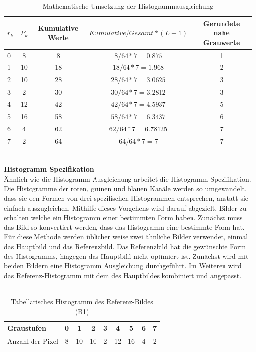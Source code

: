 \documentclass[a4paper,12pt,oneside]{article}
\begin{document}
\begin{table}
[h]
\caption{Mathematische Umsetzung der Histogrammausgleichung}
\centering
\begin{tabular}{|l|c|c|c|c|}
\hline
$r_{k}$ & $P_{k}$ & Kumulative Werte & $Kumulative/Gesamt*(L-1)$ & Gerundete nahe Grauwerte\\
\hline
0 & 8 & 8 & $8/64*7=0.875$ & 1\\
\hline
1 & 10 & 18 & $18/64*7=1.968$ & 2\\
\hline
2 & 10 & 28 & $28/64*7=3.0625$ & 3\\
\hline
3 & 2 & 30 & $30/64*7=3.2812$ & 3\\
\hline
4 & 12 & 42 & $42/64*7=4.5937$ & 5\\
\hline
5 & 16 & 58 & $58/64*7=6.3437$ & 6\\
\hline
6 & 4 & 62 & $62/64*7=6.78125$ & 7\\
\hline
7 & 2 & 64 & $64/64*7=7$ & 7\\
\hline
\end{tabular}
\end{table}\\
\textbf{Histogramm Spezifikation}\label{s.hs}\\
Ähnlich wie die Histogramm Ausgleichung arbeitet die Histogramm Spezifikation. Die Histogramme der roten, grünen und blauen Kanäle werden so umgewandelt, dass sie den Formen von drei spezifischen Histogrammen entsprechen, anstatt sie einfach auszugleichen. Mithilfe dieses Vorgehens wird darauf abgezielt, Bilder zu erhalten welche ein Histogramm einer bestimmten Form haben. Zunächst muss das Bild so konvertiert werden, dass das Histogramm eine bestimmte Form hat.
Für diese Methode werden üblicher weise zwei ähnliche Bilder verwendet, einmal das Hauptbild und das Referenzbild. Das Referenzbild hat die gewünschte Form des Histogramms, hingegen das Hauptbild nicht optimiert ist. Zunächst wird mit beiden Bildern eine Histogramm Ausgleichung durchgeführt. Im Weiteren wird das Referenz-Histogramm mit dem des Hauptbildes kombiniert und angepasst.\\\\
\begin{table}
[h]
\caption{Tabellarisches Histogramm des Referenz-Bildes (B1)}
\centering
\begin{tabular}{|l|c|c|c|c|c|c|c|c|}
\hline
Graustufen & 0 & 1 & 2 & 3 & 4 & 5 & 6 & 7\\
\hline
Anzahl der Pixel & 8 & 10 & 10 & 2 & 12 & 16 & 4 & 2\\
\hline
\end{tabular}
\end{table}\\
\end{document}
